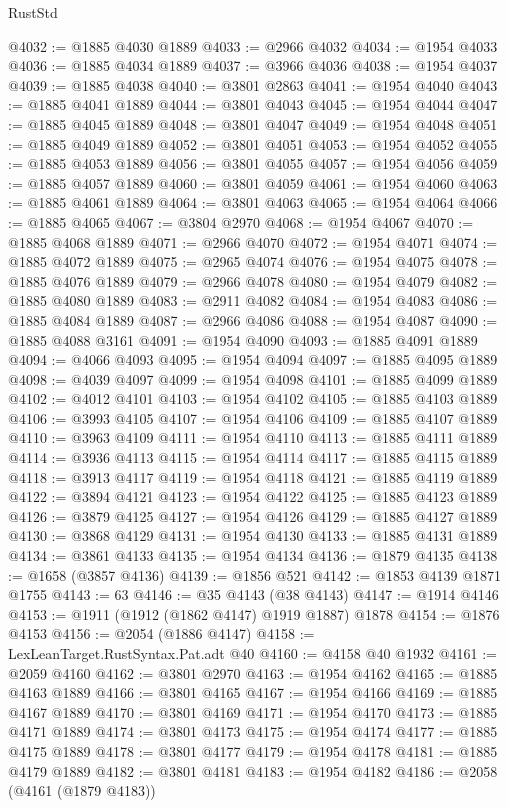 \begin{lexlean}{RustStd}
\begin{coremodule}
@4032 := @1885 @4030 @1889
@4033 := @2966 @4032
@4034 := @1954 @4033
@4036 := @1885 @4034 @1889
@4037 := @3966 @4036
@4038 := @1954 @4037
@4039 := @1885 @4038
@4040 := @3801 @2863
@4041 := @1954 @4040
@4043 := @1885 @4041 @1889
@4044 := @3801 @4043
@4045 := @1954 @4044
@4047 := @1885 @4045 @1889
@4048 := @3801 @4047
@4049 := @1954 @4048
@4051 := @1885 @4049 @1889
@4052 := @3801 @4051
@4053 := @1954 @4052
@4055 := @1885 @4053 @1889
@4056 := @3801 @4055
@4057 := @1954 @4056
@4059 := @1885 @4057 @1889
@4060 := @3801 @4059
@4061 := @1954 @4060
@4063 := @1885 @4061 @1889
@4064 := @3801 @4063
@4065 := @1954 @4064
@4066 := @1885 @4065
@4067 := @3804 @2970
@4068 := @1954 @4067
@4070 := @1885 @4068 @1889
@4071 := @2966 @4070
@4072 := @1954 @4071
@4074 := @1885 @4072 @1889
@4075 := @2965 @4074
@4076 := @1954 @4075
@4078 := @1885 @4076 @1889
@4079 := @2966 @4078
@4080 := @1954 @4079
@4082 := @1885 @4080 @1889
@4083 := @2911 @4082
@4084 := @1954 @4083
@4086 := @1885 @4084 @1889
@4087 := @2966 @4086
@4088 := @1954 @4087
@4090 := @1885 @4088 @3161
@4091 := @1954 @4090
@4093 := @1885 @4091 @1889
@4094 := @4066 @4093
@4095 := @1954 @4094
@4097 := @1885 @4095 @1889
@4098 := @4039 @4097
@4099 := @1954 @4098
@4101 := @1885 @4099 @1889
@4102 := @4012 @4101
@4103 := @1954 @4102
@4105 := @1885 @4103 @1889
@4106 := @3993 @4105
@4107 := @1954 @4106
@4109 := @1885 @4107 @1889
@4110 := @3963 @4109
@4111 := @1954 @4110
@4113 := @1885 @4111 @1889
@4114 := @3936 @4113
@4115 := @1954 @4114
@4117 := @1885 @4115 @1889
@4118 := @3913 @4117
@4119 := @1954 @4118
@4121 := @1885 @4119 @1889
@4122 := @3894 @4121
@4123 := @1954 @4122
@4125 := @1885 @4123 @1889
@4126 := @3879 @4125
@4127 := @1954 @4126
@4129 := @1885 @4127 @1889
@4130 := @3868 @4129
@4131 := @1954 @4130
@4133 := @1885 @4131 @1889
@4134 := @3861 @4133
@4135 := @1954 @4134
@4136 := @1879 @4135
@4138 := @1658 (@3857 @4136)
@4139 := @1856 @521
@4142 := @1853 @4139 @1871 @1755
@4143 := 63
@4146 := @35 @4143 (@38 @4143)
@4147 := @1914 @4146
@4153 := @1911 (@1912 (@1862 @4147) @1919 @1887) @1878
@4154 := @1876 @4153
@4156 := @2054 (@1886 @4147)
@4158 := LexLeanTarget.RustSyntax.Pat.adt @40
@4160 := @4158 @40 @1932
@4161 := @2059 @4160
@4162 := @3801 @2970
@4163 := @1954 @4162
@4165 := @1885 @4163 @1889
@4166 := @3801 @4165
@4167 := @1954 @4166
@4169 := @1885 @4167 @1889
@4170 := @3801 @4169
@4171 := @1954 @4170
@4173 := @1885 @4171 @1889
@4174 := @3801 @4173
@4175 := @1954 @4174
@4177 := @1885 @4175 @1889
@4178 := @3801 @4177
@4179 := @1954 @4178
@4181 := @1885 @4179 @1889
@4182 := @3801 @4181
@4183 := @1954 @4182
@4186 := @2058 (@4161 (@1879 @4183))

\end{coremodule}
\end{lexlean}
